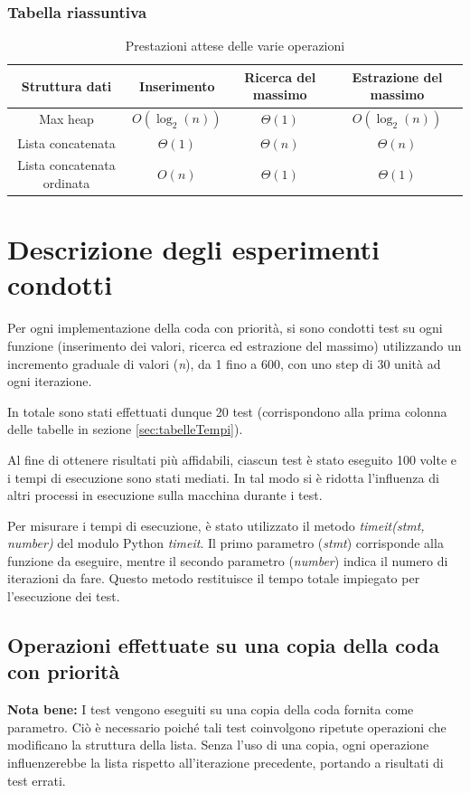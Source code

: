 \documentclass{article}
\begin{document}
\subsubsection{Tabella riassuntiva}

\begin{table}[ht]
  \centering
  \begin{tabular}{cccc}
    \toprule
    Struttura dati & Inserimento & Ricerca del massimo & Estrazione del massimo \\
    \midrule
    Max heap & $O(\log_2(n))$ & $\Theta(1)$ & $O(\log_2(n))$   \\
    \hdashline
    Lista concatenata & $\Theta(1)$ & $\Theta(n)$ & $\Theta(n)$   \\
    \hdashline
    Lista concatenata ordinata & $O(n)$ & $\Theta(1)$ & $\Theta(1)$  \\
    \bottomrule
  \end{tabular}
    \caption{Prestazioni attese delle varie operazioni}
    \label{tab:Prestazioni}
\end{table}

\clearpage

\section{Descrizione degli esperimenti condotti}
Per ogni implementazione della coda con priorità, si sono condotti test su ogni funzione (inserimento dei valori, ricerca ed estrazione del massimo) utilizzando un incremento graduale di valori (\textit{n}), da 1 fino a 600, con uno step di 30 unità ad ogni iterazione. 

In totale sono stati effettuati dunque 20 test (corrispondono alla prima colonna delle tabelle in sezione \ref{sec:tabelleTempi}).

Al fine di ottenere risultati più affidabili, ciascun test è stato eseguito 100 volte e i tempi di esecuzione sono stati mediati. In tal modo si è ridotta l'influenza di altri processi in esecuzione sulla macchina durante i test.

Per misurare i tempi di esecuzione, è stato utilizzato il metodo \textit{timeit(stmt, number)} del modulo Python \textit{timeit}. Il primo parametro (\emph{stmt}) corrisponde alla funzione da eseguire, mentre il secondo parametro (\emph{number}) indica il numero di iterazioni da fare. Questo metodo restituisce il tempo totale impiegato per l'esecuzione dei test.

\subsection{Operazioni effettuate su una copia della coda con priorità}
\textbf{Nota bene:}  I test vengono eseguiti su una copia della coda fornita come parametro. Ciò è necessario poiché tali test coinvolgono ripetute operazioni che modificano la struttura della lista. Senza l'uso di una copia, ogni operazione influenzerebbe la lista rispetto all'iterazione precedente, portando a risultati di test errati.
\end{document}
